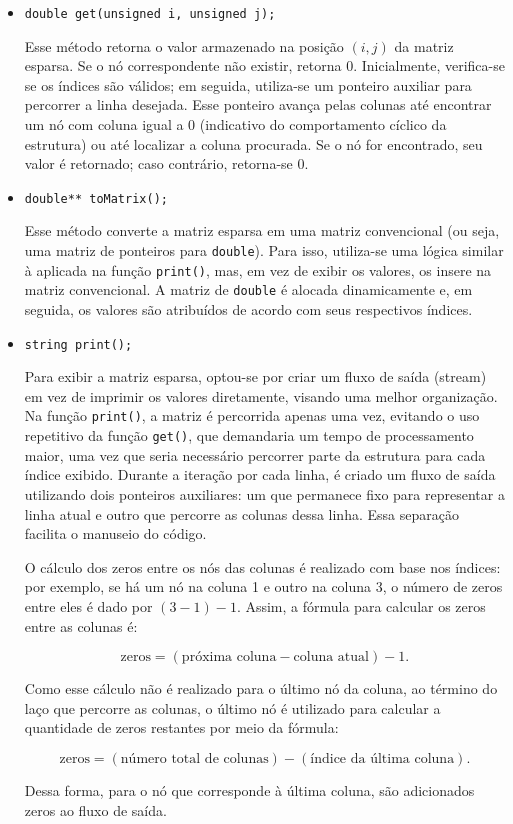 \documentclass[12pt]{article}
\begin{document}
\begin{itemize}
    \item \verb|double get(unsigned i, unsigned j);|
    
    \newline Esse método retorna o valor armazenado na posição \((i, j)\) da matriz esparsa. Se o nó correspondente não existir, retorna 0. Inicialmente, verifica-se se os índices são válidos; em seguida, utiliza-se um ponteiro auxiliar para percorrer a linha desejada. Esse ponteiro avança pelas colunas até encontrar um nó com coluna igual a 0 (indicativo do comportamento cíclico da estrutura) ou até localizar a coluna procurada. Se o nó for encontrado, seu valor é retornado; caso contrário, retorna-se 0.
    
    \item \verb|double** toMatrix();|
    
    \newline Esse método converte a matriz esparsa em uma matriz convencional (ou seja, uma matriz de ponteiros para \verb|double|). Para isso, utiliza-se uma lógica similar à aplicada na função \verb|print()|, mas, em vez de exibir os valores, os insere na matriz convencional. A matriz de \verb|double| é alocada dinamicamente e, em seguida, os valores são atribuídos de acordo com seus respectivos índices.
    
    \item \verb|string print();|
    
    \newline Para exibir a matriz esparsa, optou-se por criar um fluxo de saída (stream) em vez de imprimir os valores diretamente, visando uma melhor organização. Na função \verb|print()|, a matriz é percorrida apenas uma vez, evitando o uso repetitivo da função \verb|get()|, que demandaria um tempo de processamento maior, uma vez que seria necessário percorrer parte da estrutura para cada índice exibido. Durante a iteração por cada linha, é criado um fluxo de saída utilizando dois ponteiros auxiliares: um que permanece fixo para representar a linha atual e outro que percorre as colunas dessa linha. Essa separação facilita o manuseio do código. 
    
    O cálculo dos zeros entre os nós das colunas é realizado com base nos índices: por exemplo, se há um nó na coluna 1 e outro na coluna 3, o número de zeros entre eles é dado por \((3 - 1) - 1\). Assim, a fórmula para calcular os zeros entre as colunas é:
    
    \[
    \text{zeros} = (\text{próxima coluna} - \text{coluna atual}) - 1.
    \]
    
    Como esse cálculo não é realizado para o último nó da coluna, ao término do laço que percorre as colunas, o último nó é utilizado para calcular a quantidade de zeros restantes por meio da fórmula:
    
    \[
    \text{zeros} = (\text{número total de colunas}) - (\text{índice da última coluna}).
    \]
    
    Dessa forma, para o nó que corresponde à última coluna, são adicionados zeros ao fluxo de saída.
    
\end{itemize}
\end{document}
